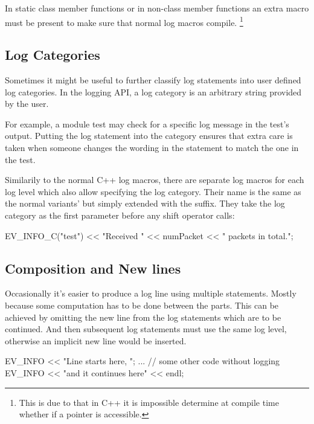 In static class member functions or in non-class member functions an extra
 macro must be present to make sure that normal log
macros compile. \footnote{This is due to that in C++ it is impossible
determine at compile time whether if a  pointer is accessible.}

\begin{cpp}
void findModule(const char *name, cModule *from)
{
    EV_STATICCONTEXT;
    EV_TRACE << "findModule(" << name << ", " << from << ");" << endl;
\end{cpp}

\subsection{Log Categories}

Sometimes it might be useful to further classify log statements into user
defined log categories. In the {\opp} logging API, a log category is an
arbitrary string provided by the user.

For example, a module test may check for a specific log message in the test's
output. Putting the log statement into the  category ensures that
extra care is taken when someone changes the wording in the statement to match
the one in the test.

Similarily to the normal C++ log macros, there are separate log macros for each
log level which also allow specifying the log category. Their name is the same
as the normal variants' but simply extended with the  suffix. They
take the log category as the first parameter before any shift operator calls:

\begin{cpp}
EV_INFO_C("test") << "Received " << numPacket << " packets in total.\n";
\end{cpp}

\subsection{Composition and New lines}

Occasionally it's easier to produce a log line using multiple statements.
Mostly because some computation has to be done between the parts. This can be
achieved by omitting the new line from the log statements which are to be
continued. And then subsequent log statements must use the same log level,
otherwise an implicit new line would be inserted.

\begin{cpp}
EV_INFO << "Line starts here, ";
... // some other code without logging
EV_INFO << "and it continues here" << endl;
\end{cpp}

